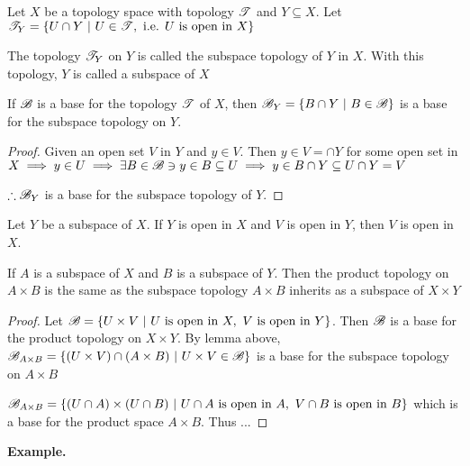 Let $X$ be a topology space with topology $\mathscr{T}$ and $Y \subseteq X$. Let $\mathscr{T}_Y = \{U \cap Y ~|~ U \in \mathscr{T} , \text{ i.e. } U \text{ is open in }X\}$

\begin{defn}
	The topology $\mathscr{T}_Y$ on $Y$ is called the subspace topology of $Y$ in $X$. With this topology, $Y$ is called a subspace of $X$
\end{defn}

\begin{lmma*}
	If $\mathscr{B}$ is a base for the topology $\mathscr{T}$ of $X$, then $\mathscr{B}_Y = \{B \cap Y ~|~ B \in \mathscr{B}\}$ is a base for the subspace topology on $Y$.
\end{lmma*}

\begin{proof}
	Given an open set $V$ in $Y$ and $y \in V$. Then $y \in V =  \cap Y$ for some open set in $X \implies y \in U \implies \exists B \in \mathscr{B} \ni y \in B \subseteq U \implies y \in B \cap Y \subseteq U \cap Y = V$
	
	$\therefore \mathscr{B}_Y$ is a base for the subspace topology of $Y$.
\end{proof}

\begin{lmma*}
	Let $Y$ be a subspace of $X$. If $Y$ is open in $X$ and $V$ is open in $Y$, then $V$ is open in $X$.
\end{lmma*}

\begin{thm*}
	If $A$ is a subspace of $X$ and $B$ is a subspace of $Y$. Then the product topology on $A \times B$ is the same as the subspace topology $A \times B$ inherits as a subspace of $X \times Y$
\end{thm*}

\begin{proof}
	Let $\mathscr{B} = \{U \times V ~|~ U \text{ is open in }X,~V\text{ is open in }Y\}$. Then $\mathscr{B}$ is a base for the product topology on $X \times Y$. By lemma above, $\mathscr{B}_{A \times B} = \{(U \times V) \cap (A \times B)~|~ U \times V \in \mathscr{B}\}$ is a base for the subspace topology on $A \times B$
	
	$\mathscr{B}_{A \times B} = \{(U \cap A) \times (U \cap B)~|~ U \cap A \text{ is open in }A,~ V \cap B \text{ is open in } B\}$ which is a base for the product space $A \times B$. Thus ...
\end{proof}

\textbf{Example.}

